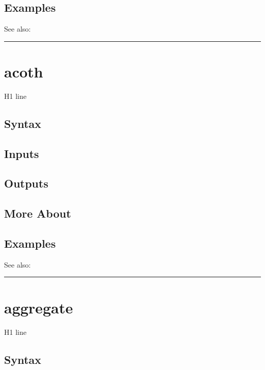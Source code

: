 \documentclass[letterpaper,10pt,english]{sphinxmanual}
\begin{document}
\subsection{Examples}
\label{classes/time_series/@ts/ts:id16}
See also:


\bigskip\hrule{}\bigskip



\section{acoth}
\label{classes/time_series/@ts/ts:acoth}\label{classes/time_series/@ts/ts:id17}
H1 line


\subsection{Syntax}
\label{classes/time_series/@ts/ts:id18}

\subsection{Inputs}
\label{classes/time_series/@ts/ts:id19}

\subsection{Outputs}
\label{classes/time_series/@ts/ts:id20}

\subsection{More About}
\label{classes/time_series/@ts/ts:id21}

\subsection{Examples}
\label{classes/time_series/@ts/ts:id22}
See also:


\bigskip\hrule{}\bigskip



\section{aggregate}
\label{classes/time_series/@ts/ts:aggregate}\label{classes/time_series/@ts/ts:id23}
H1 line


\subsection{Syntax}
\label{classes/time_series/@ts/ts:id24}
\end{document}
